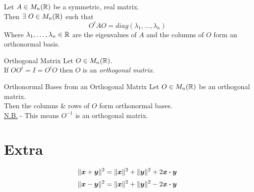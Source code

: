 \documentclass[11pt,a4paper]{article}
\begin{document}
\subtitle{Theorem 10.15}{}
Let $A \in M_n(\mathbb{R})$ be a symmetric, real matrix.\\
Then $\exists\ O \in M_n(\mathbb{R})$ such that
$$O^tAO = diag(\lambda_1, \dots, \lambda_n)$$
Where $\lambda_1, \dots, \lambda_n \in \mathbb{R}$ are the eigenvalues of $A$ and the columns of $O$ form an orthonormal basis.\\

\subtitle{Definition 10.16 - }{Orthogonal Matrix}
Let $O \in M_n(\mathbb{R})$.\\
If $OO^t = I = O^tO$ then $O$ is an \textit{orthogonal matrix}.\\

\subtitle{Remark 10.17 - }{Orthonormal Bases from an Orthogonal Matrix}
Let $O \in M_n(\mathbb{R})$ be an orthogonal matrix.\\
Then the columns \& rows of $O$ form orthonormal bases.\\
\underline{N.B.} - This means $O^{-1}$ is an orthogonal matrix.

\newpage\section{Extra}

\subtitle{Parraleofram Rule}{}
$$\|\boldsymbol{x}+\boldsymbol{y}\|^2 = \|\boldsymbol{x}\|^2 + \|\boldsymbol{y}\|^2 + 2\boldsymbol{x}\boldsymbol{\cdot}\boldsymbol{y}$$
$$\|\boldsymbol{x}-\boldsymbol{y}\|^2 = \|\boldsymbol{x}\|^2 + \|\boldsymbol{y}\|^2 - 2\boldsymbol{x}\boldsymbol{\cdot}\boldsymbol{y}$$
\end{document}
